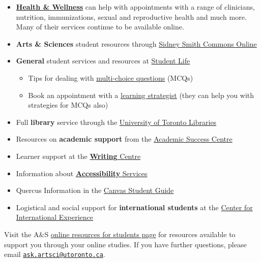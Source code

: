 \documentclass[
  openany]{book}
\begin{document}
\begin{itemize}
\item
  \href{https://studentlife.utoronto.ca/department/health-wellness/}{\textbf{Health \& Wellness}} can help with appointments with a range of clinicians, nutrition, immunizations, sexual and reproductive health and much more. Many of their services continue to be available online.
\item
  \textbf{Arts \& Sciences} student resources through \href{https://sidneysmithcommons.artsci.utoronto.ca/}{Sidney Smith Commons Online}
\item
  \textbf{General} student services and resources at \href{https://www.studentlife.utoronto.ca/}{Student Life}

  \begin{itemize}
  \item
    Tips for dealing with \href{https://studentlife.utoronto.ca/task/multiple-choice-tests-and-exams/}{multi-choice questions} (MCQs)
  \item
    Book an appointment with a \href{https://studentlife.utoronto.ca/service/learning-strategist-connections/}{learning strategist} (they can help you with strategies for MCQs also)
  \end{itemize}
\item
  Full \textbf{library} service through the \href{http://onesearch.library.utoronto.ca/}{University of Toronto Libraries}
\item
  Resources on \textbf{academic support} from the \href{http://www.asc.utoronto.ca/}{Academic Success Centre}
\item
  Learner support at the \href{http://www.writing.utoronto.ca/}{\textbf{Writing} Centre}
\item
  Information about \href{http://accessibility.utoronto.ca/}{\textbf{Accessibility} Services}
\item
  Quercus Information in the \href{https://community.canvaslms.com/docs/DOC-10701}{Canvas Student Guide}
\item
  Logistical and social support for \textbf{international students} at the \href{https://studentlife.utoronto.ca/cie}{Center for International Experience}
\end{itemize}

Visit the A\&S \href{https://www.artsci.utoronto.ca/current/academic-advising-and-support/online-resources-students}{online resources for students page} for resources available to support you through your online studies. If you have further questions, please email \href{mailto:ask.artsci@utoronto.ca}{\nolinkurl{ask.artsci@utoronto.ca}}.
\end{document}
